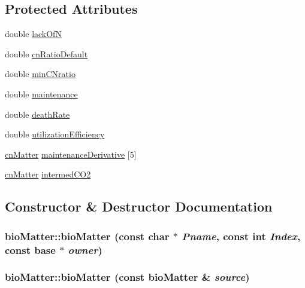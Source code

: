 \subsection*{Protected Attributes}
\begin{DoxyCompactItemize}
\item 
double \hyperlink{classbio_matter_a9214fdfd62a75f0146840fe03819263f}{lackOfN}
\item 
double \hyperlink{classbio_matter_a325fa37c8d609f93e7845a1eb13e69f5}{cnRatioDefault}
\item 
double \hyperlink{classbio_matter_a21cbe8a3a8d628f8e4be1d8e98225fc4}{minCNratio}
\item 
double \hyperlink{classbio_matter_aeb728b264870ae8765d7aa01cc617de3}{maintenance}
\item 
double \hyperlink{classbio_matter_a31e599ecc6d625bc325b03d5e32a6bb5}{deathRate}
\item 
double \hyperlink{classbio_matter_a7e4373da6cb4863f815e793ffa69922a}{utilizationEfficiency}
\item 
\hyperlink{classcn_matter}{cnMatter} \hyperlink{classbio_matter_a33a01ec3e0a379392d4843ed9ce3f07d}{maintenanceDerivative} \mbox{[}5\mbox{]}
\item 
\hyperlink{classcn_matter}{cnMatter} \hyperlink{classbio_matter_a7caed5f32d3daea9def8aa41408295de}{intermedCO2}
\end{DoxyCompactItemize}


\subsection{Constructor \& Destructor Documentation}
\hypertarget{classbio_matter_ae91ef4deaba37a7927d114ec83bc4114}{
\subsubsection[{bioMatter}]{\setlength{\rightskip}{0pt plus 5cm}bioMatter::bioMatter (const char $\ast$ {\em Pname}, \/  const int {\em Index}, \/  const {\bf base} $\ast$ {\em owner})}}
\label{classbio_matter_ae91ef4deaba37a7927d114ec83bc4114}
\hypertarget{classbio_matter_ac40fd3ea8d47fe6865b7b3b0c73cae1a}{
\subsubsection[{bioMatter}]{\setlength{\rightskip}{0pt plus 5cm}bioMatter::bioMatter (const {\bf bioMatter} \& {\em source})}}
\label{classbio_matter_ac40fd3ea8d47fe6865b7b3b0c73cae1a}


